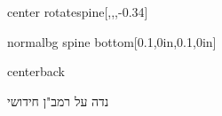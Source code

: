 \documentclass[
coverheight=11.25in
coverwidth=8.625in
spinewidth=0.75in
bleedwidth=.125in
marklength=0in,
12pt,
pagecolor=background,
]{bookcover}
\newcommand{\hebtitle}{
נדה על רמב"ן חידושי}
\newcommand{\engtitle}{
}
\newcommand{\hebtext}[1]{
	\begin{hebrew}
		#1
	\end{hebrew}
}
\begin{document}
	\begin{bookcover}
		\begin{bookcoverelement}{center rotate}{spine}[,,,-0.34\coverheight]
		\end{bookcoverelement}
		\begin{bookcoverelement}{normal}{bg spine bottom}[0.1\spinewidth,0in,0.1\spinewidth,0in]
		\end{bookcoverelement}
		
		\begin{bookcoverelement}{center}{back}
			\begin{Huge}
				\textcolor{text}{\hebtext{\hebtitle}}
				
				\textcolor{text}{\engtitle}
				
			\end{Huge}
			\vspace{2\baselineskip}
			\begin{large}
			\end{large}
		\end{bookcoverelement}
	\end{bookcover}
\end{document}
